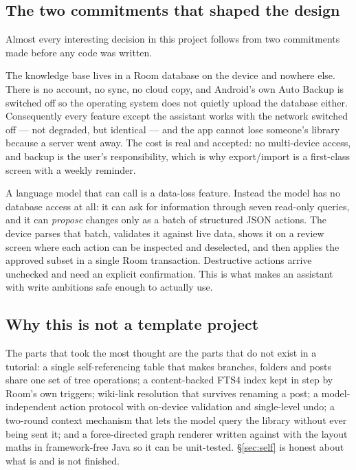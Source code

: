 \subsection{The two commitments that shaped the design}

Almost every interesting decision in this project follows from two commitments made before any code was
written.

\begin{mochabox}[title={1. Local-first, not offline-tolerant}]
The knowledge base lives in a Room database on the device and nowhere else. There is no account, no sync,
no cloud copy, and Android's own Auto Backup is switched off so the operating system does not quietly
upload the database either. Consequently every feature except the assistant works with the network
switched off --- not degraded, but identical --- and the app cannot lose someone's library because a
server went away. The cost is real and accepted: no multi-device access, and backup is the user's
responsibility, which is why export/import is a first-class screen with a weekly reminder.
\end{mochabox}

\begin{mochabox}[title={2. The AI never writes to the database}]
A language model that can call  is a data-loss feature. Instead the model has no database
access at all: it can ask for information through seven read-only queries, and it can \emph{propose}
changes only as a batch of structured JSON actions. The device parses that batch, validates it against
live data, shows it on a review screen where each action can be inspected and deselected, and then
applies the approved subset in a single Room transaction. Destructive actions arrive unchecked and need an
explicit confirmation. This is what makes an assistant with write ambitions safe enough to actually use.
\end{mochabox}

\subsection{Why this is not a template project}

The parts that took the most thought are the parts that do not exist in a tutorial: a single
self-referencing table that makes branches, folders and posts share one set of tree operations; a
content-backed FTS4 index kept in step by Room's own triggers; wiki-link resolution that survives
renaming a post; a model-independent action protocol with on-device validation and single-level undo; a
two-round context mechanism that lets the model query the library without ever being sent it; and a
force-directed graph renderer written against  with the layout maths in framework-free Java
so it can be unit-tested. \S\ref{sec:self} is honest about what is and is not finished.
